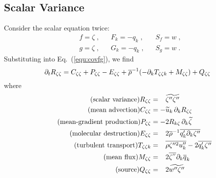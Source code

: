 \subsection{Scalar Variance}

Consider the scalar equation twice:
\begin{align}
    &f = \zeta\;, && F_k=-q_{k}\;, && S_f = w\;,\\
    &g = \zeta\;, && G_k=-q_{k}\;, && S_g = w\;.
\end{align}
Substituting into Eq.~(\ref{equ:covfg}), we find
\begin{equation}\label{equ:Rss}
    \pt{R_{\zeta \zeta}}{t}= C_{\zeta\zeta}+P_{\zeta\zeta} - E_{\zeta\zeta}
    +\avr{\rho}^{-1} (- \pt{T_{\zeta\zeta k}}{k} +M_{\zeta\zeta} ) + Q_{\zeta\zeta}
\end{equation}
where
\begin{align}
    \tag{scalar variance}
    R_{\zeta \zeta} &=\phantom{-} \avf{\zeta''\zeta''}\\
    \tag{mean advection}
    C_{\zeta \zeta} &=-\avf{u}_k\,\pt{R_{\zeta \zeta}}{k}\\
    \tag{mean-gradient production}
    P_{\zeta \zeta} &=-2 R_{k \zeta}\,\pt{\avf{\zeta}}{k}\\
    \tag{molecular destruction}
    E_{\zeta\zeta} &=\phantom{-} 2 \avr{\rho}^{-1}\avr{q_k' \pt{\zeta''}{k}}\\
    \tag{turbulent transport}
    T_{\zeta\zeta k}&=\phantom{-} \avr{\rho \zeta''^{2} u''_k } -2 \avr{q_k'\zeta''}\\
    \tag{mean flux}
    M_{\zeta\zeta}  &=\phantom{-} 2 \avr{\zeta^{''}} \pt{\avr{q}_k}{k}\\
    \tag{source}
    Q_{\zeta\zeta}  &=\phantom{-} 2 \avf{w''\zeta''}
\end{align}
